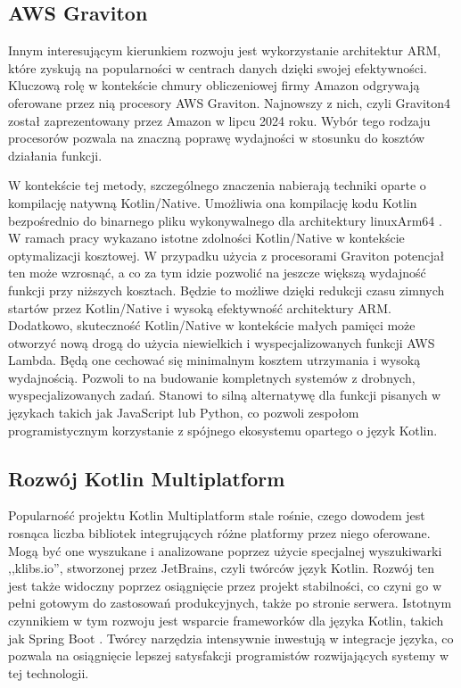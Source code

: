 \subsection*{AWS Graviton}

Innym interesującym kierunkiem rozwoju jest wykorzystanie architektur ARM, które zyskują na popularności w centrach danych dzięki swojej efektywności.
Kluczową rolę w kontekście chmury obliczeniowej firmy Amazon odgrywają oferowane przez nią procesory AWS Graviton.
Najnowszy z nich, czyli Graviton4 został zaprezentowany przez Amazon w lipcu 2024 roku.
Wybór tego rodzaju procesorów pozwala na znaczną poprawę wydajności w stosunku do kosztów działania funkcji.

W kontekście tej metody, szczególnego znaczenia nabierają techniki oparte o kompilację natywną Kotlin/Native.
Umożliwia ona kompilację kodu Kotlin bezpośrednio do binarnego pliku wykonywalnego dla architektury linuxArm64 \cite{kotlinlangKotlinDocs}.
W ramach pracy wykazano istotne zdolności Kotlin/Native w kontekście optymalizacji kosztowej.
W przypadku użycia z procesorami Graviton potencjał ten może wzrosnąć, a co za tym idzie pozwolić na jeszcze większą wydajność funkcji przy niższych kosztach.
Będzie to możliwe dzięki redukcji czasu zimnych startów przez Kotlin/Native i wysoką efektywność architektury ARM.
Dodatkowo, skuteczność Kotlin/Native w kontekście małych pamięci może otworzyć nową drogą do użycia niewielkich i wyspecjalizowanych funkcji AWS Lambda.
Będą one cechować się minimalnym kosztem utrzymania i wysoką wydajnością. 
Pozwoli to na budowanie kompletnych systemów z drobnych, wyspecjalizowanych zadań. 
Stanowi to silną alternatywę dla funkcji pisanych w językach takich jak JavaScript lub Python, co pozwoli zespołom programistycznym korzystanie z spójnego ekosystemu opartego o język Kotlin.

\subsection*{Rozwój Kotlin Multiplatform}

Popularność projektu Kotlin Multiplatform stale rośnie, czego dowodem jest rosnąca liczba bibliotek integrujących różne platformy przez niego oferowane.
Mogą być one wyszukane i analizowane poprzez użycie specjalnej wyszukiwarki ,,klibs.io'', stworzonej przez JetBrains, czyli twórców język Kotlin.
Rozwój ten jest także widoczny poprzez osiągnięcie przez projekt stabilności, co czyni go w pełni gotowym do zastosowań produkcyjnych, także po stronie serwera.
Istotnym czynnikiem w tym rozwoju jest wsparcie frameworków dla języka Kotlin, takich jak Spring Boot \cite{spring-kotlin-docs}.
Twórcy narzędzia intensywnie inwestują w integracje języka, co pozwala na osiągnięcie lepszej satysfakcji programistów rozwijających systemy w tej technologii.


